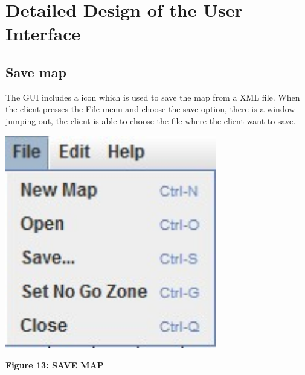 \documentclass[11pt, a4paper]{report}
\begin{document}
\section{Detailed Design of the User Interface}
\subsection{Save map}
The GUI includes a icon which is used to save the map from a XML file. When the client presses the File menu and choose the save option, there is a window jumping out, the client is able to choose the file where the client want to save.  
\begin{center}
 \includegraphics[width=9.20cm]{save}
\end{center}
\begin{center}
\textbf {Figure 13: SAVE MAP} \\[0.3cm]
\end{center}
\end{document}
